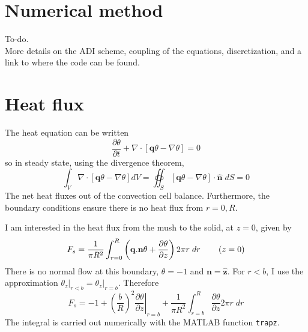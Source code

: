 \documentclass[11pt]{proc}
\begin{document}
\newpage
\appendix
\label{appendix}

\section{Numerical method}
\label{app:numerical-method}
To-do. \\
More details on the ADI scheme, coupling of the equations, discretization, and a link to where the code can be found.

\section{Heat flux}
\label{app:heat-flux}
The heat equation can be written
\begin{equation}
\frac{\partial \theta}{\partial t} + \nabla \cdot \left[ \mathbf{q} \theta - \nabla \theta \right] = 0
\end{equation}
so in steady state, using the divergence theorem,
\begin{equation}
\int_V \nabla \cdot \left[ \mathbf{q} \theta - \nabla \theta \right] dV = \oiint_S \left[ \mathbf{q} \theta - \nabla \theta \right] \cdot \mathbf{\hat{n}} \; dS = 0
\end{equation}
The net heat fluxes out of the convection cell balance. Furthermore, the boundary conditions ensure there is no heat flux from $r=0, R$.

I am interested in the heat flux from the mush to the solid, at $z=0$, given by
\begin{equation}
F_{s} = \frac{1}{\pi R^2} \int_{r=0}^R \left( \mathbf{q}.\mathbf{n} \theta + \frac{\partial \theta}{\partial z} \right) 2 \pi r \; dr \hspace{5ex} (z=0)
\end{equation}
There is no normal flow at this boundary, $\theta=-1$ and $\mathbf{n} = \mathbf{\hat{z}}$. For $r<b$, I use the approximation $\left. \theta_z \right|_{r<b} = \left. \theta_z \right|_{r=b}$. Therefore
\begin{equation}
F_{s} = - 1  + \left( \frac{b}{R} \right)^2 \left.  \frac{\partial \theta}{\partial z} \right|_{r=b} + \frac{1}{\pi R^2} \int_{r=b}^R  \frac{\partial \theta}{\partial z}  2 \pi r \; dr
\end{equation}
The integral is carried out numerically with the MATLAB function \texttt{trapz}.
\end{document}
